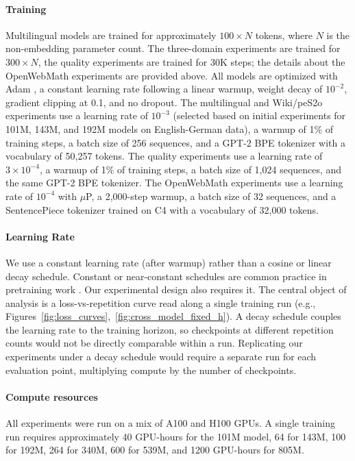 \paragraph{Training}
Multilingual models are trained for approximately $100 \times N$ tokens, where $N$ is the non-embedding parameter count.
The three-domain experiments are trained for $300 \times N$, the quality experiments are trained for 30K steps; the details about the OpenWebMath experiments are provided above.
All models are optimized with Adam \citep{kingma2014adam}, 
a constant learning rate following a linear warmup, weight decay of $10^{-2}$, gradient clipping at 0.1, and no dropout.
The multilingual and Wiki/peS2o experiments use a learning rate of $10^{-3}$ (selected based on initial experiments for 101M, 143M, and 192M models on English-German data), a warmup of 1\% of training steps, a batch size of 256 sequences, and a GPT-2 BPE tokenizer \citep{radford2019language} with a vocabulary of 50,257 tokens.
The quality experiments use a learning rate of $3 \times 10^{-4}$, a warmup of 1\% of training steps, a batch size of 1,024 sequences, and the same GPT-2 BPE tokenizer.
The OpenWebMath experiments use a learning rate of $10^{-4}$ with $\mu$P,%
a 2,000-step warmup, a batch size of 32 sequences, and a SentencePiece tokenizer \citep{kudo2018sentencepiece} trained on C4 \citep{raffel2020exploring} with a vocabulary of 32,000 tokens.

\paragraph{Learning Rate}
We use a constant learning rate (after warmup) rather than a cosine or linear decay schedule.
Constant or near-constant schedules are common practice in pretraining work \citep{hagele2024scaling,porian2025resolving}.
Our experimental design also requires it. The central object of analysis is a loss-vs-repetition curve read along a single training run (e.g., Figures~\ref{fig:loss_curves},~\ref{fig:cross_model_fixed_h}). A decay schedule couples the learning rate to the training horizon, so checkpoints at different repetition counts would not be directly comparable within a run. Replicating our experiments under a decay schedule would require a separate run for each evaluation point, multiplying compute by the number of checkpoints.

\paragraph{Compute resources}
All experiments were run on a mix of A100 and H100 GPUs.
A single training run requires approximately 40 GPU-hours for the 101M model, 64 for 143M, 100 for 192M, 264 for 340M, 600 for 539M, and 1200 GPU-hours for 805M.


